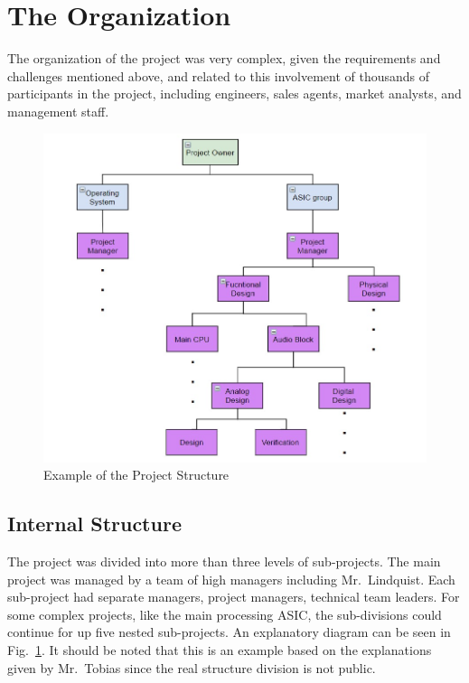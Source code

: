 \documentclass[conference]{IEEEtran}
\begin{document}
\section{The Organization}
The organization of the project was very complex, given the requirements and challenges mentioned above, and related to this involvement of thousands of participants in the project, including engineers, sales agents, market analysts, and management staff. 

\begin{figure}[h]
    \centering
    \includegraphics[width=\linewidth]{project_structure.jpg}
    \caption{Example of the Project Structure}
    \label{fig:project_structure}
\end{figure}

\subsection{Internal Structure}
The project was divided into more than three levels of sub-projects. The main project was managed by a team of high managers including Mr.~Lindquist. Each sub-project had separate managers, project managers, technical team leaders. For some complex projects, like the main processing ASIC, the sub-divisions could continue for up five nested sub-projects. An explanatory diagram can be seen in Fig.~\ref{fig:project_structure}. It should be noted that this is an example based on the explanations given by Mr.~Tobias since the real structure division is not public.
\end{document}
